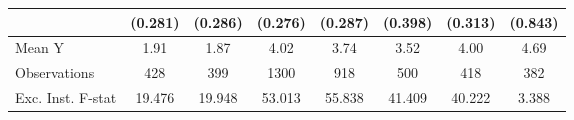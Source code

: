 {\begin{tabular}{l*{7}{c}}
            &     (0.281)         &     (0.286)         &     (0.276)         &     (0.287)         &     (0.398)         &     (0.313)         &     (0.843)         \\
\midrule
Mean Y      &        1.91         &        1.87         &        4.02         &        3.74         &        3.52         &        4.00         &        4.69         \\
Observations&         428         &         399         &        1300         &         918         &         500         &         418         &         382         \\
Exc. Inst. F-stat&      19.476         &      19.948         &      53.013         &      55.838         &      41.409         &      40.222         &       3.388         \\
\bottomrule
\end{tabular}
}
